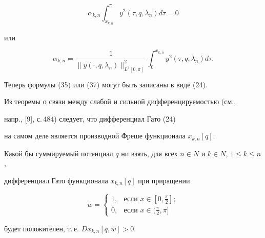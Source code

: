 \begin{pf}
\begin{equation}
\alpha_{k,n}\int^\pi_{x_{k,n}}y^2(\tau,q,\lambda_n)d\tau=0 


\end{equation} 


или 


$$ 


\alpha_{k,n}=\frac{1} 


{\|y(\cdot,q,\lambda_n)\|^2_{L^2[0,\pi]}} 


\int^{x_{k,n}}_0 y^2(\tau,q,\lambda_n)d\tau. 


$$ 


Теперь формулы (35) или (37) могут быть записаны в виде (24). 


\end{pf} 


 


\begin{note} 


Из теоремы о связи между слабой и сильной дифференцируемостью (см., 


напр., [9], с.\,484) следует, что дифференциал Гато (24) 


на самом деле является производной Фреше функционала $x_{k,n}[q]$. 


\end{note} 


 


\begin{lem} 


Какой бы суммируемый потенциал $q$ ни взять, для всех $n\in N$ и $k\in 


N$, $1\le k\le n$, 


дифференциал Гато функционала $x_{k,n}[q]$ при приращении 


\begin{equation} 


w= 


\begin{cases} 


1, &\text{если } x\in[0,\frac{\pi}{2}];\\ 


0, &\text{если } x\in(\frac{\pi}{2},\pi] 


\end{cases} 


\end{equation} 


будет положителен, т.\,е. $D x_{k,n}[q,w]>0$. 


\end{lem} 


